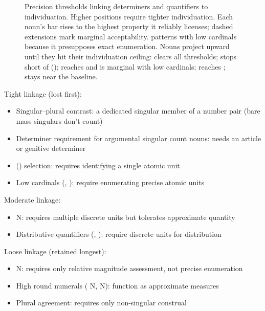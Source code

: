 \documentclass[12pt,a4paper]{article}
\begin{document}
\begin{figure}[t]
\caption{Precision thresholds linking determiners and quantifiers to individuation. Higher positions require tighter individuation. Each noun's bar rises to the highest property it reliably licenses; dashed extensions mark marginal acceptability.  patterns with low cardinals because it presupposes exact enumeration. Nouns project upward until they hit their individuation ceiling:  clears all thresholds;  stops short of ();  reaches  and is marginal with low cardinals;  reaches ;  stays near the baseline.}
\label{fig:threshold}
\end{figure}

Tight linkage (lost first):
\begin{itemize}
\item Singular--plural contrast: a dedicated singular member of a number pair (bare mass singulars don't count)
\item Determiner requirement for argumental singular count nouns: needs an article or genitive determiner
\item {}() selection: requires identifying a single atomic unit
\item Low cardinals (, ): require enumerating precise atomic units
\end{itemize}

Moderate linkage:
\begin{itemize}
\item {} N: requires multiple discrete units but tolerates approximate quantity
\item Distributive quantifiers (, ): require discrete units for distribution
\end{itemize}

Loose linkage (retained longest):
\begin{itemize}
\item {} N: requires only relative magnitude assessment, not precise enumeration
\item High round numerals ( N,  N): function as approximate measures
\item Plural agreement: requires only non-singular construal
\end{itemize}
\end{document}
